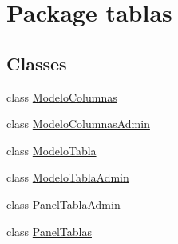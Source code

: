 \hypertarget{namespacetablas}{}\section{Package tablas}
\label{namespacetablas}
\subsection*{Classes}
\begin{DoxyCompactItemize}
\item 
class \mbox{\hyperlink{classtablas_1_1_modelo_columnas}{Modelo\+Columnas}}
\item 
class \mbox{\hyperlink{classtablas_1_1_modelo_columnas_admin}{Modelo\+Columnas\+Admin}}
\item 
class \mbox{\hyperlink{classtablas_1_1_modelo_tabla}{Modelo\+Tabla}}
\item 
class \mbox{\hyperlink{classtablas_1_1_modelo_tabla_admin}{Modelo\+Tabla\+Admin}}
\item 
class \mbox{\hyperlink{classtablas_1_1_panel_tabla_admin}{Panel\+Tabla\+Admin}}
\item 
class \mbox{\hyperlink{classtablas_1_1_panel_tablas}{Panel\+Tablas}}
\end{DoxyCompactItemize}
